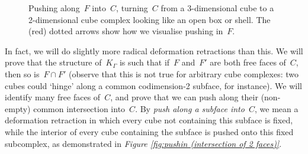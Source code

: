\documentclass[11pt]{amsart}
\theoremstyle{definition}
\theoremstyle{definition}
\theoremstyle{definition}
\theoremstyle{definition}
\newcommand{\spine}{K_{\Gamma}} %
\begin{document}
\begin{figure}[H]
\begin{center}
        \caption{Pushing along~$F$ into~$C$, turning~$C$ from a 3-dimensional cube to a 2-dimensional cube complex looking like an open box or shell. The (red) dotted arrows show how we visualise pushing in~$F$.}
        \label{fig:pushin (1 face)}
    \end{center}
\end{figure}

In fact, we will do slightly more radical deformation retractions than this. We will prove that the structure of~$\spine$ is such that if~$F$ and~$F'$ are both free faces of~$C$, then so is~$F \cap F'$ (observe that this is not true for arbitrary cube complexes: two cubes could `hinge' along a common codimension-2 subface, for instance). We will identify many free faces of~$C$, and prove that we can push along their (non-empty) common intersection into~$C$. By \emph{push along a subface into~$C$}, we mean a deformation retraction in which every cube not containing this subface is fixed, while the interior of every cube containing the subface is pushed onto this fixed subcomplex, as demonstrated in \textit{Figure \ref{fig:pushin (intersection of 2 faces)}}.
\end{document}
